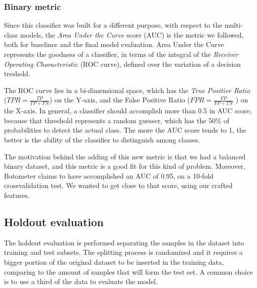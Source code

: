\subsubsection{Binary metric}
Since this classifier was built for a different purpose, with respect to the multi-class models, the \textit{Area Under the Curve} score (AUC) is the metric we followed, both for baselines and the final model evaluation.
Area Under the Curve represents the goodness of a classifier, in terms of the integral of the \textit{Receiver Operating Characteristic} (ROC curve), defined over the variation of a decision treshold.

The ROC curve lies in a bi-dimensional space, which has the \textit{True Positive Ratio} ($ TPR =  \frac{TP}{TP+FN}$) on the Y-axis, and the False Positive Ratio ($ FPR =  \frac{FP}{FP+TN}$ ) on the X-axis.
In general, a classifier should accomplish more than 0.5 in AUC score, because that threshold represents a random guesser, which has the 50\% of probabilities to detect the actual class.
The more the AUC score tends to 1, the better is the ability of the classifier to distinguish among classes.

The motivation behind the adding of this new metric is that we had a balanced binary dataset, and this metric is a good fit for this kind of problem. Moreover, Botometer claims to have accomplished an AUC of 0.95, on a 10-fold crossvalidation test.
We wanted to get close to that score, using our crafted features.


\subsection{Holdout evaluation}
The holdout evaluation is performed separating the samples in the dataset into training and test subsets. The splitting process is randomized and it requires a bigger portion of the original dataset to be inserted in the training data, comparing to the amount of samples that will form the test set. A common choice is to use a third of the data to evaluate the model.

